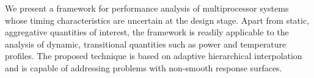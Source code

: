 We present a framework for performance analysis of multiprocessor systems whose
timing characteristics are uncertain at the design stage. Apart from static,
aggregative quantities of interest, the framework is readily applicable to the
analysis of dynamic, transitional quantities such as power and temperature
profiles. The proposed technique is based on adaptive hierarchical
interpolation and is capable of addressing problems with non-smooth response
surfaces.
